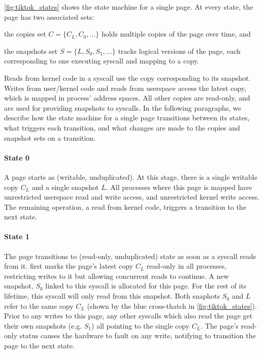 \documentclass[letterpaper,twocolumn,10pt, anonymous]{article}
\begin{document}
\autoref{fig:tiktok_states} shows the state machine for a single page.
At every state, the page has two associated sets:
\begin{inparaenum}
  \item the copies set $C = \{C_L, C_0, \dots\}$ holds multiple copies of the page over time, and
  \item the snapshots set $S = \{L, S_0, S_1, \dots\}$ tracks logical versions of the page, each corresponding to one executing syscall and mapping to a copy. 
\end{inparaenum}
Reads from kernel code in a syscall use the copy corresponding to its snapshot.
Writes from user/kernel code and reads from userspace access the latest 
copy, which is mapped in process' address spaces.
All other copies are read-only, and are used for providing snapshots to syscalls.
In the following paragraphs, we describe how the state machine for a single page 
transitions between its states, what triggers each transition, and what 
changes are made to the copies and snapshot sets on a transition.

\paragraph{State 0}
A page starts as (writable, unduplicated). 
At this stage, there is a single writable copy $C_L$ and a single snapshot $L$. 
All processes where this page is mapped have unrestricted userspace read and write 
access, and unrestricted kernel write access.
The remaining operation, a read from kernel code, triggers a transition to 
the next state.

\paragraph{State 1}
The page transitions to (read-only, unduplicated) state as soon as a syscall 
reads from it. 
\tiktok first marks the page's latest copy $C_L$ read-only in all processes, 
restricting writes to it but allowing concurrent reads to continue.
A new snapshot, $S_0$ linked to this syscall is allocated for this page.
For the rest of its lifetime, this syscall will only read from this snapshot.
Both snaphots $S_0$ and $L$ refer to the same copy $C_L$ (shown by the 
blue cross-thatch in \autoref{fig:tiktok_states}).
Prior to any writes to this page, any other syscalls which also read the page  
get their own snapshots (e.g. $S_1$) all pointing to the single copy $C_L$.
The page's read-only status causes the hardware to fault on any write,
notifying \tiktok to transition the page to the next state.
\end{document}
